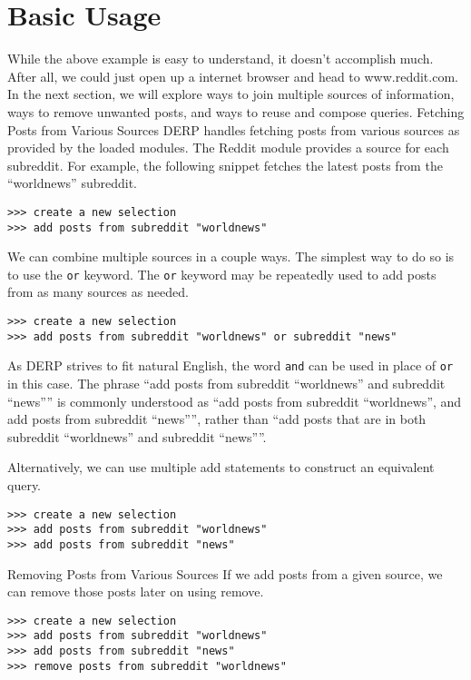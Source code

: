 \section{Basic Usage}
While the above example is easy to understand, it doesn’t accomplish much. After all, we could just open up a internet browser and head to www.reddit.com.
In the next section, we will explore ways to join multiple sources of information, ways to remove unwanted posts, and ways to reuse and compose queries.
Fetching Posts from Various Sources
DERP handles fetching posts from various sources as provided by the loaded modules. The Reddit module provides a source for each subreddit. For example,
the following snippet fetches the latest posts from the “worldnews” subreddit.
\begin{lstlisting}
>>> create a new selection
>>> add posts from subreddit "worldnews"
\end{lstlisting}
We can combine multiple sources in a couple ways. The simplest way to do so is to use the \texttt{or} keyword. The \texttt{or} keyword may be repeatedly used to add posts
from as many sources as needed.
\begin{lstlisting}
>>> create a new selection
>>> add posts from subreddit "worldnews" or subreddit "news"
\end{lstlisting}
As DERP strives to fit natural English, the word \texttt{and} can be used in place of \texttt{or} in this case. The phrase “add posts from subreddit “worldnews” and
subreddit “news”” is commonly understood as “add posts from subreddit “worldnews”, and add posts from subreddit “news””, rather than “add posts that
are in both subreddit “worldnews” and subreddit “news””.

Alternatively, we can use multiple add statements to construct an equivalent query.
\begin{lstlisting}
>>> create a new selection
>>> add posts from subreddit "worldnews"
>>> add posts from subreddit "news"
\end{lstlisting}
Removing Posts from Various Sources
If we add posts from a given source, we can remove those posts later on using remove.
\begin{lstlisting}
>>> create a new selection
>>> add posts from subreddit "worldnews"
>>> add posts from subreddit "news"
>>> remove posts from subreddit "worldnews"
\end{lstlisting}
